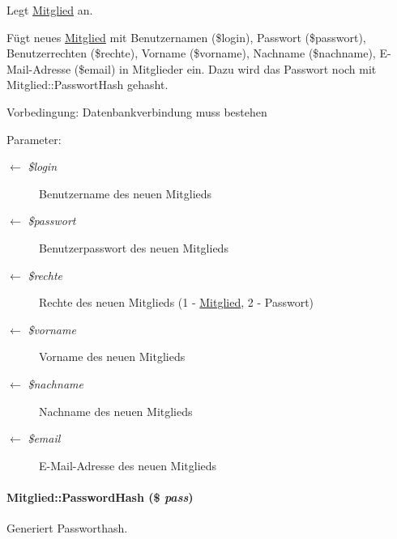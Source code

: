 Legt \hyperlink{classMitglied}{Mitglied} an. 

Fügt neues \hyperlink{classMitglied}{Mitglied} mit Benutzernamen (\$login), Passwort (\$passwort), Benutzerrechten (\$rechte), Vorname (\$vorname), Nachname (\$nachname), E-Mail-Adresse (\$email) in Mitglieder ein. Dazu wird das Passwort noch mit Mitglied::Passwort\-Hash gehasht. \begin{Desc}
\item[Vorbedingung:]Datenbankverbindung muss bestehen \end{Desc}
\begin{Desc}
\item[Parameter:]
\begin{description}
\item[\mbox{$\leftarrow$} {\em \$login}]Benutzername des neuen Mitglieds \item[\mbox{$\leftarrow$} {\em \$passwort}]Benutzerpasswort des neuen Mitglieds \item[\mbox{$\leftarrow$} {\em \$rechte}]Rechte des neuen Mitglieds (1 - \hyperlink{classMitglied}{Mitglied}, 2 - Passwort) \item[\mbox{$\leftarrow$} {\em \$vorname}]Vorname des neuen Mitglieds \item[\mbox{$\leftarrow$} {\em \$nachname}]Nachname des neuen Mitglieds \item[\mbox{$\leftarrow$} {\em \$email}]E-Mail-Adresse des neuen Mitglieds\end{description}
\end{Desc}
\hypertarget{classMitglied_9b13db80866c22bf992e73f2eb75e369}{
\paragraph[PasswordHash]{\setlength{\rightskip}{0pt plus 5cm}Mitglied::Password\-Hash (\$ {\em pass})}\hfill}
\label{classMitglied_9b13db80866c22bf992e73f2eb75e369}


Generiert Passworthash. 


